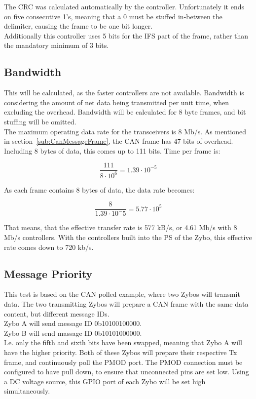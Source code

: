 The CRC was calculated automatically by the controller.
Unfortunately it ends on five consecutive 1's, meaning that a 0 must be stuffed in-between the delimiter, causing the frame to be one bit longer.\\

Additionally this controller uses 5 bits for the IFS part of the frame, rather than the mandatory minimum of 3 bits. 



\subsection{Bandwidth}\label{sub:CAN_bandwidth}
This will be calculated, as the faster controllers are not available.
Bandwidth is considering the amount of net data being transmitted per unit time, when excluding the overhead.
Bandwidth will be calculated for 8 byte frames, and bit stuffing will be omitted.\\

The maximum operating data rate for the transceivers is 8 Mb/s.
As mentioned in section~\ref{sub:CanMessageFrame}, the CAN frame has 47 bits of overhead. 
Including 8 bytes of data, this comes up to 111 bits. 
Time per frame is:

\begin{equation}
\frac{111}{8 \cdot 10^6} = 1.39 \cdot 10^{-5}
\end{equation}

As each frame contains 8 bytes of data, the data rate becomes:

\begin{equation}
\frac{8}{1.39 \cdot 10^-5}= 5.77 \cdot 10^5
\end{equation}

That means, that the effective transfer rate is 577 kB/s, or 4.61 Mb/s with 8 Mb/s controllers. 
With the controllers built into the PS of the Zybo, this effective rate comes down to 720 kb/s.

\subsection{Message Priority}\label{sub:CAN_message priority}
This test is based on the CAN polled example, where two Zybos will transmit data.
The two transmitting Zybos will prepare a CAN frame with the same data content, but different message IDs.\\
Zybo A will send message ID 0b10100100000.\\
Zybo B will send massage ID 0b10101000000.\\
I.e. only the fifth and sixth bits have been swapped, meaning that Zybo A will have the higher priority.
Both of these Zybos will prepare their respective Tx frame, and continuously poll the PMOD port.
The PMOD connection must be configured to have pull down, to ensure that unconnected pins are set low.
Using a DC voltage source, this GPIO port of each Zybo will be set high simultaneously.\\

